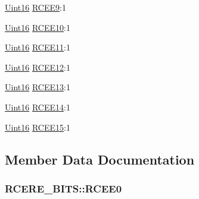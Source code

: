 \begin{DoxyCompactItemize}
\item 
\hyperlink{_d_s_p2833x___device_8h_a59a9f6be4562c327cbfb4f7e8e18f08b}{Uint16} \hyperlink{struct_r_c_e_r_e___b_i_t_s_a38c00efe5afde95aa4b1c97ed66b8f0d}{R\+C\+E\+E9}\+:1
\item 
\hyperlink{_d_s_p2833x___device_8h_a59a9f6be4562c327cbfb4f7e8e18f08b}{Uint16} \hyperlink{struct_r_c_e_r_e___b_i_t_s_a206aedcafc0c797a96bcc9dfd6508c73}{R\+C\+E\+E10}\+:1
\item 
\hyperlink{_d_s_p2833x___device_8h_a59a9f6be4562c327cbfb4f7e8e18f08b}{Uint16} \hyperlink{struct_r_c_e_r_e___b_i_t_s_acd8d8884bed7326a8399843fa3bd97db}{R\+C\+E\+E11}\+:1
\item 
\hyperlink{_d_s_p2833x___device_8h_a59a9f6be4562c327cbfb4f7e8e18f08b}{Uint16} \hyperlink{struct_r_c_e_r_e___b_i_t_s_a467fbb5508d0e6e368f308e4e2c17b01}{R\+C\+E\+E12}\+:1
\item 
\hyperlink{_d_s_p2833x___device_8h_a59a9f6be4562c327cbfb4f7e8e18f08b}{Uint16} \hyperlink{struct_r_c_e_r_e___b_i_t_s_a8bf23d89f3b093a44b715c2c036ded1d}{R\+C\+E\+E13}\+:1
\item 
\hyperlink{_d_s_p2833x___device_8h_a59a9f6be4562c327cbfb4f7e8e18f08b}{Uint16} \hyperlink{struct_r_c_e_r_e___b_i_t_s_ab10c7bdb8c58fc96b9b84e81b8ac8743}{R\+C\+E\+E14}\+:1
\item 
\hyperlink{_d_s_p2833x___device_8h_a59a9f6be4562c327cbfb4f7e8e18f08b}{Uint16} \hyperlink{struct_r_c_e_r_e___b_i_t_s_a97e314586dc78bbb2e70ac1488a9cec0}{R\+C\+E\+E15}\+:1
\end{DoxyCompactItemize}


\subsection{Member Data Documentation}
\hypertarget{struct_r_c_e_r_e___b_i_t_s_ad2db1b9eadf51fde66ddb430f88e3005}{}
\subsubsection[{R\+C\+E\+E0}]{ R\+C\+E\+R\+E\+\_\+\+B\+I\+T\+S\+::\+R\+C\+E\+E0}\label{struct_r_c_e_r_e___b_i_t_s_ad2db1b9eadf51fde66ddb430f88e3005}
\hypertarget{struct_r_c_e_r_e___b_i_t_s_a4a021330a20a8141b28a544a00bc5f7f}{}
